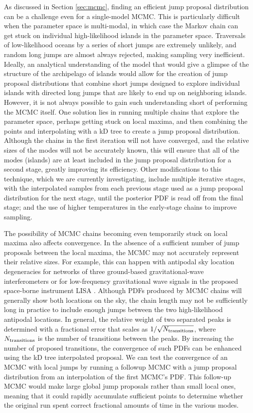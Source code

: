 \documentclass[prd,preprint]{revtex4}
\begin{document}
As discussed in Section \ref{sec:mcmc}, finding an efficient jump proposal distribution can be a challenge even for a single-model MCMC.  This is particularly difficult when the parameter space is multi-modal, in which case the Markov chain can get stuck on individual high-likelihood islands in the parameter space.  Traversals of low-likelihood oceans by a series of short jumps are extremely unlikely, and random long jumps are almost always rejected, making sampling very inefficient.  Ideally, an analytical understanding of the model that would give a glimpse of the structure of the archipelago of islands would allow for the creation of jump proposal distributions that combine short jumps designed to explore individual islands with directed long jumps that are likely to end up on neighboring islands.  However, it is not always possible to gain such understanding short of performing the MCMC itself.  One solution lies in running multiple chains that explore the parameter space, perhaps getting stuck on local maxima, and then combining the points and interpolating with a kD tree to create a jump proposal distribution.  Although the chains in the first iteration will not have converged, and the relative sizes of the modes will not be accurately known, this will ensure that all of the modes (islands) are at least included in the jump proposal distribution for a second stage, greatly improving its efficiency.  Other modifications to this technique, which we are currently investigating, include multiple iterative stages, with the interpolated samples from each previous stage used as a jump proposal distribution for the next stage, until the posterior PDF is read off from the final stage; and the use of higher temperatures in the early-stage chains to improve sampling.

The possibility of MCMC chains becoming even temporarily stuck on
local maxima also affects convergence.  In the absence of a sufficient
number of jump proposals between the local maxima, the MCMC may not
accurately represent their relative sizes.  For example, this can
happen with antipodal sky location degeneracies for networks of three
ground-based gravitational-wave interferometers or for low-frequency
gravitational wave signals in the proposed space-borne instrument LISA
\cite{LISA}.  Although PDFs produced by MCMC chains will generally
show both locations on the sky, the chain length may not be
sufficiently long in practice to include enough jumps between the two
high-likelihood antipodal locations.  In general, the relative weight
of two separated peaks is determined with a fractional error that
scales as $1/\sqrt{N_{\textnormal{transitions}}}$, where
$N_{\textnormal{transitions}}$ is the number of transitions between
the peaks.  By increasing the number of proposed transitions, the
convergence of such PDFs can be enhanced using the kD tree
interpolated proposal.  We can test the convergence of an MCMC with
local jumps by running a followup MCMC with a jump proposal
distribution from an interpolation of the first MCMC's PDF.  This
follow-up MCMC would make large global jump proposals rather than
small local ones, meaning that it could rapidly accumulate sufficient
points to determine whether the original run spent correct fractional
amounts of time in the various modes.
\end{document}
